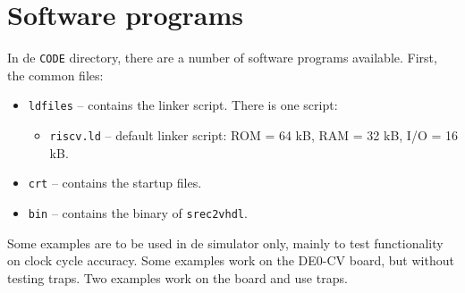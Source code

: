 \documentclass[12pt]{article}
\begin{document}
\section{Software programs}
In de \texttt{CODE} directory, there are a number of software programs available. First, the common files:

\begin{itemize}
\item \texttt{ldfiles} -- contains the linker script. There is one script:
\begin{itemize}
\item \texttt{riscv.ld} -- default linker script: ROM = 64 kB, RAM = 32 kB, I/O = 16 kB.
\end{itemize}
\item \texttt{crt} -- contains the startup files.
\item \texttt{bin} -- contains the binary of \texttt{srec2vhdl}.
\end{itemize}

Some examples are to be used in de simulator only, mainly to test functionality on clock cycle accuracy. Some examples work on the DE0-CV board, but without testing traps. Two examples work on the board and use traps.
\end{document}
